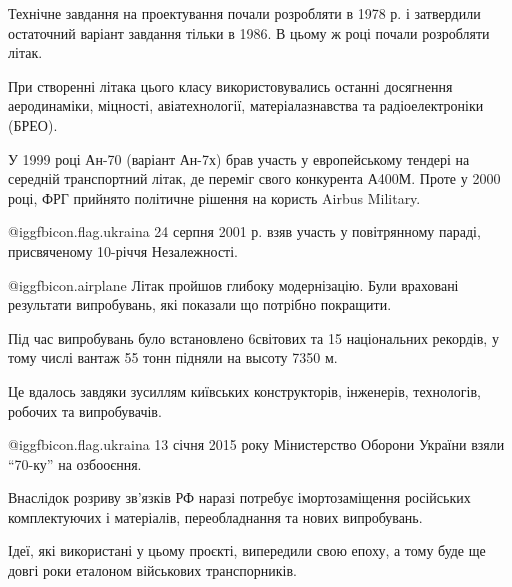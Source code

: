 Технічне завдання на проектування почали розробляти в 1978 р. і затвердили
остаточний варіант завдання тільки в 1986. В цьому ж році почали розробляти
літак.

При створенні літака цього класу використовувались останні досягнення
аеродинаміки, міцності, авіатехнології, матеріалазнавства та радіоелектроніки
(БРЕО). 

У 1999 році Ан-70 (варіант Ан-7х) брав участь у европейському тендері на
середній транспортний літак, де переміг свого конкурента А400М. Проте у 2000
році, ФРГ прийнято політичне рішення на користь Airbus Military. 

@igg{fbicon.flag.ukraina} 24 серпня 2001 р.  взяв участь у повітрянному параді,
присвяченому 10-річчя Незалежності. 

@igg{fbicon.airplane} Літак пройшов глибоку модернізацію. Були враховані  результати випробувань,
які показали що потрібно покращити. 

Під час випробувань було встановлено 6світових та 15 національних рекордів, у
тому числі вантаж 55 тонн підняли на высоту 7350 м.

Це вдалось завдяки зусиллям київських конструкторів, інженерів, технологів,
робочих та випробувачів.

@igg{fbicon.flag.ukraina} 13 січня 2015 року Мінистерство Оборони України взяли
\enquote{70-ку} на озбооєння.

Внаслідок розриву зв'язків РФ наразі потребує імортозаміщення російських
комплектуючих і матеріалів, переобладнання та нових випробувань.

Ідеї, які використані у цьому проєкті, випередили свою епоху, а тому буде ще
довгі роки еталоном військових транспорників.

